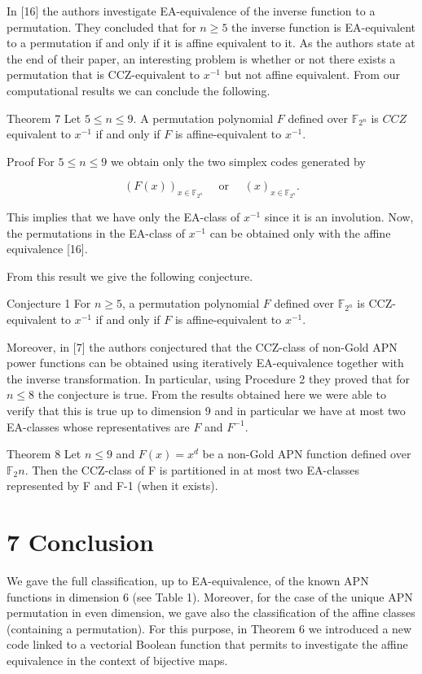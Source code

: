 \documentclass[10pt]{article}
\begin{document}
In [16] the authors investigate EA-equivalence of the inverse function to a permutation. They concluded that for $n \geq 5$ the inverse function is EA-equivalent to a permutation if and only if it is affine equivalent to it. As the authors state at the end of their paper, an interesting problem is whether or not there exists a permutation that is CCZ-equivalent to $x^{-1}$ but not affine equivalent. From our computational results we can conclude the following.

Theorem 7 Let $5 \leq n \leq 9$. A permutation polynomial $F$ defined over $\mathbb{F}_{2^{n}}$ is $C C Z$ equivalent to $x^{-1}$ if and only if $F$ is affine-equivalent to $x^{-1}$.

Proof For $5 \leq n \leq 9$ we obtain only the two simplex codes generated by

$$
(F(x))_{x \in \mathbb{F}_{2^{n}}} \quad \text { or } \quad(x)_{x \in \mathbb{F}_{2^{n}}} .
$$

This implies that we have only the EA-class of $x^{-1}$ since it is an involution. Now, the permutations in the EA-class of $x^{-1}$ can be obtained only with the affine equivalence [16].

From this result we give the following conjecture.

Conjecture 1 For $n \geq 5$, a permutation polynomial $F$ defined over $\mathbb{F}_{2^{n}}$ is CCZ-equivalent to $x^{-1}$ if and only if $F$ is affine-equivalent to $x^{-1}$.

Moreover, in [7] the authors conjectured that the CCZ-class of non-Gold APN power functions can be obtained using iteratively EA-equivalence together with the inverse transformation. In particular, using Procedure 2 they proved that for $n \leq 8$ the conjecture is true. From the results obtained here we were able to verify that this is true up to dimension 9 and in particular we have at most two EA-classes whose representatives are $F$ and $F^{-1}$.

Theorem 8 Let $n \leq 9$ and $F(x)=x^{d}$ be a non-Gold APN function defined over $\mathbb{F}_{2} n$. Then the CCZ-class of F is partitioned in at most two EA-classes represented by F and F-1 (when it exists).

\section*{7 Conclusion}
We gave the full classification, up to EA-equivalence, of the known APN functions in dimension 6 (see Table 1). Moreover, for the case of the unique APN permutation in even dimension, we gave also the classification of the affine classes (containing a permutation). For this purpose, in Theorem 6 we introduced a new code linked to a vectorial Boolean function that permits to investigate the affine equivalence in the context of bijective maps.
\end{document}
